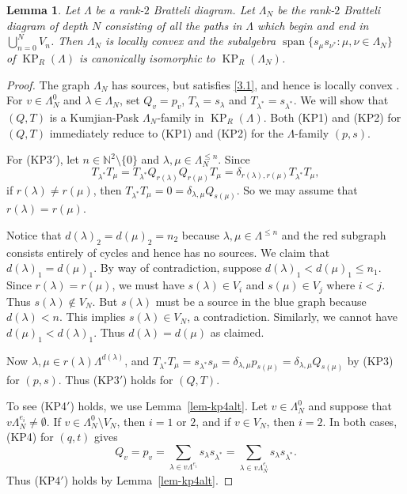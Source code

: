 \documentclass[a4paper,12pt]{amsart}
\numberwithin{equation}{section}
\newtheorem{lemma}[thm]{Lemma}
\theoremstyle{definition}
\theoremstyle{remark}
\begin{document}
\begin{lemma}\label{lem-helper-cut'} Let $\Lambda$ be a rank-$2$ Bratteli diagram.
Let $\Lambda_N$ be the rank-$2$ Bratteli diagram of depth $N$ consisting of all the paths in $\Lambda$ which begin and end in $\bigcup_{n=0}^N V_n$. Then $\Lambda_N$ is locally convex and  the subalgebra ${\operatorname{\mathrm{span}}}\{s_\mu s_{\nu^*}:\mu,\nu\in\Lambda_N\}$ of $\operatorname{KP}_R(\Lambda)$ is canonically isomorphic to $\operatorname{KP}_R(\Lambda_N)$.
\end{lemma}

\begin{proof}  The graph  $\Lambda_N$ has sources, but satisfies \eqref{3.1}, and hence is locally convex \cite[page 141]{PRRS}.
For $v\in\Lambda_N^0$ and $\lambda\in\Lambda_N$, set $Q_v=p_v$, $T_\lambda=s_\lambda$ and $T_{\lambda^*}=s_{\lambda^*}$. We will show that $(Q,T)$ is a Kumjian-Pask $\Lambda_N$-family in $\operatorname{KP}_R(\Lambda)$. Both (KP1) and (KP2) for $(Q,T)$ immediately reduce to (KP1) and (KP2) for the $\Lambda$-family $(p,s)$.

For (KP3$'$), let $n\in{\mathbb{N}}^2\setminus\{0\}$ and $\lambda,\mu\in\Lambda_N^{\leq n}$. 
Since \[
T_{\lambda^*}T_\mu=T_{\lambda^*}Q_{r(\lambda)}Q_{r(\mu)}T_\mu=\delta_{r(\lambda), r(\mu)}T_{\lambda^*}T_\mu,\] if  $r(\lambda)\neq r(\mu)$, then $T_{\lambda^*}T_\mu=0=\delta_{\lambda,\mu}Q_{s(\mu)}$. So we may assume that $r(\lambda)=r(\mu)$. 

Notice that $d(\lambda)_2 = d(\mu)_2 = n_2$ because $\lambda, \mu \in \Lambda^{\leq n}$ and the red 
subgraph consists entirely of cycles and hence has no sources.  We claim that $d(\lambda)_1=d(\mu)_1$.  
By way of contradiction, 
suppose $d(\lambda)_1 < d(\mu)_1 \leq n_1$.  Since $r(\lambda)=r(\mu)$, we must have $s(\lambda)\in V_i$  and  $s(\mu)\in V_j$ where $i<j$.  
Thus $s(\lambda)\notin V_N$. But  $s(\lambda)$ 
must be  a source in the blue graph because $d(\lambda)<n$. This implies $s(\lambda)\in V_N$, a contradiction.
 Similarly, we cannot have $d(\mu)_1 < d(\lambda)_1$. Thus $d(\lambda)=d(\mu)$ as claimed. 

  Now  $\lambda,\mu\in r(\lambda)\Lambda^{d(\lambda)}$, and $T_{\lambda^*}T_\mu=s_{\lambda^*}s_\mu=\delta_{\lambda,\mu}p_{s(\mu)}=\delta_{\lambda,\mu}Q_{s(\mu)}$ by (KP3) for $(p,s)$.   Thus (KP3$'$) holds for $(Q,T)$.

To see  (KP4$'$) holds, we use Lemma~\ref{lem-kp4alt}. Let $v\in\Lambda^0_N$ and suppose that $v\Lambda_N^{e_i}\neq\emptyset$. If $v\in\Lambda_N^0\setminus V_N$, then $i=1$ or $2$, and  if $v\in V_N$, then $i=2$. In both cases,  (KP4) for $(q,t)$ gives \[Q_v=p_v=\sum_{\lambda\in v\Lambda^{e_i}}s_\lambda s_{\lambda^*}= \sum_{\lambda\in v\Lambda_N^{e_i}}s_\lambda s_{\lambda^*}.\]
Thus (KP4$'$) holds by Lemma~\ref{lem-kp4alt}.


\end{proof}
\end{document}
